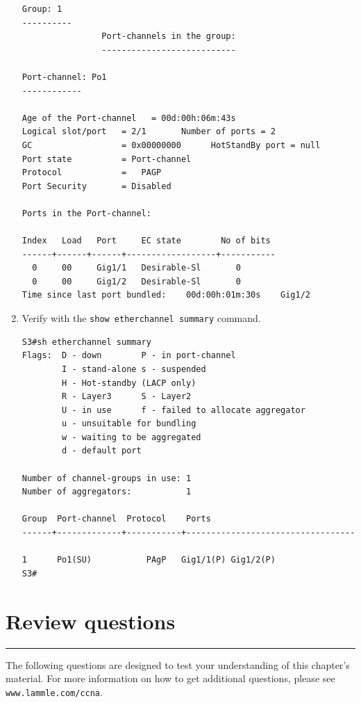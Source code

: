 \documentclass[b5paper,11pt]{memoir}
\begin{document}
\begin{enumerate}
\begin{verbatim}
Group: 1
----------
                Port-channels in the group:
                ---------------------------
 
Port-channel: Po1
------------
 
Age of the Port-channel   = 00d:00h:06m:43s
Logical slot/port   = 2/1       Number of ports = 2
GC                  = 0x00000000      HotStandBy port = null
Port state          = Port-channel
Protocol            =   PAGP
Port Security       = Disabled
 
Ports in the Port-channel:
 
Index   Load   Port     EC state        No of bits
------+------+------+------------------+-----------
  0     00     Gig1/1   Desirable-Sl       0
  0     00     Gig1/2   Desirable-Sl       0
Time since last port bundled:    00d:00h:01m:30s    Gig1/2
\end{verbatim}
\item
  Verify with the \texttt{show\ etherchannel\ summary} command.

\begin{verbatim}
S3#sh etherchannel summary
Flags:  D - down        P - in port-channel
        I - stand-alone s - suspended
        H - Hot-standby (LACP only)
        R - Layer3      S - Layer2
        U - in use      f - failed to allocate aggregator
        u - unsuitable for bundling
        w - waiting to be aggregated
        d - default port
 
Number of channel-groups in use: 1
Number of aggregators:           1
 
Group  Port-channel  Protocol    Ports
------+-------------+-----------+----------------------------------
 
1      Po1(SU)           PAgP   Gig1/1(P) Gig1/2(P)
S3#
\end{verbatim}
\end{enumerate}

\section{Review questions}

\begin{center}\rule{0.5\linewidth}{0.5pt}\end{center}

The following questions are designed to
test your understanding of this chapter's material. For more information
on how to get additional questions, please see
\texttt{www.lammle.com/ccna}.
\end{document}
